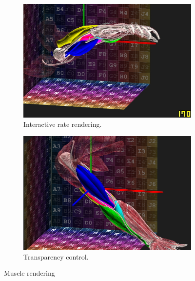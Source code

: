 \begin{figure}
    \centering
    \begin{subfigure}[t]{0.45\textwidth}
        \centering
        \includegraphics[width=\textwidth]{./Figures/visFPS.jpg}
        \caption{Interactive rate rendering.}
        \label{fig:visFPS}
    \end{subfigure}
\hfill
    \begin{subfigure}[t]{0.45\textwidth}
        \centering
        \includegraphics[width=\textwidth]{./Figures/transparencyConfig.jpg}
        \caption{Transparency control.}
        \label{fig:transparency}
    \end{subfigure}

    \caption{Muscle rendering}
    \label{fig:muscleRendering}
\end{figure}